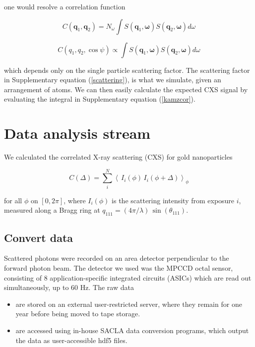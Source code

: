 \documentclass [12pt,fleqn]{article}
\def \be {\begin{equation}}
\def \ee {\end{equation}}
\begin{document}
one would resolve a correlation function 

\be
C( \bm q_1, \bm q_2  ) = N_\omega \int S( \bm q_1, \bm \omega ) S( \bm q_2, \bm \omega ) d\omega
\ee

\be \label {kamzcor}
C( q_1, q_2, \cos \psi   ) \propto \int S( \bm q_1, \bm \omega ) S( \bm q_2, \bm \omega ) d\omega
\ee

which depends only on the single particle scattering factor.  The scattering factor in Supplementary equation (\ref{scattering}), is what we simulate, given an arrangement of atoms. We can then easily calculate the expected CXS signal by evaluating the integral in Supplementary equation (\ref{kamzcor}). 

\section{Data analysis stream}
We calculated the correlated X-ray scattering (CXS) for gold nanoparticles

\begin{equation} \label{supp:c111}
C(\Delta) = \sum_i^N  \left \langle \,I_i( \phi) \,I_i(\phi +\Delta) \right \rangle _\phi
\end{equation}

for all $\phi$ on $[0,2\pi]$, where $I_i(\phi)$ is the scattering intensity from exposure $i$, measured along a Bragg ring at $q_{111}=(4\pi/\lambda)\,\sin(\theta_{111})$.

\subsection{Convert data}
Scattered photons were recorded on an area detector perpendicular to the forward photon beam. The detector we used was the MPCCD octal sensor, consisting of 8 application-specific integrated circuits (ASICs) which are read out simultaneously, up to 60 Hz. The raw data 

\begin{itemize}
\item are stored on an external user-restricted server, where they remain for one year before being moved to tape storage. 
\item are accessed using in-house SACLA data conversion programs, which output the data as user-accessible hdf5 files.  
\end{itemize}
\end{document}
